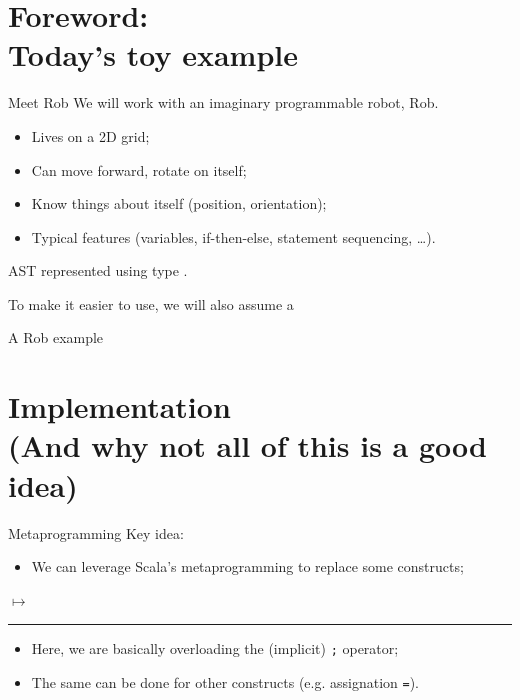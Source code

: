 \documentclass{beamer}
\newcommand{\translation}[2][0.5]{%
    \begin{minipage}[t]{#1\textwidth - 0.05\textwidth}%
    \end{minipage}%
    \hfill{}$\longmapsto$\hfill{}%
    \begin{minipage}[t]{0.95\textwidth - #1\textwidth}%
    \end{minipage}
    \rule{\textwidth}{0.4pt}
}
\begin{document}
    \section{Foreword:\\Today's toy example}

    \begin{frame}{Meet Rob}
        We will work with an imaginary programmable robot, Rob.
        \begin{itemize}
            \item Lives on a 2D grid;
            \item Can move forward, rotate on itself;
            \item Know things about itself (position, orientation);
            \item Typical features (variables, if-then-else, statement sequencing, \ldots{}).
        \end{itemize}

        AST represented using type .

        \pause
        To make it easier to use, we will also assume a
    \end{frame}

    \begin{frame}{A Rob example}
        

    \end{frame}

    \section{Implementation\\\footnotesize{(And why not all of this is a good idea)}}

    \begin{frame}{Metaprogramming}
        Key idea:
        \begin{itemize}
            \item We can leverage Scala's metaprogramming to replace some constructs;
        \end{itemize}
        \translation{code/rewriting}
        \begin{itemize}
            \item<2-> Here, we are basically overloading the (implicit) \lstinline{;} operator;
            \item<2-> The same can be done for other constructs (e.g. assignation \lstinline{=}).
        \end{itemize}
    \end{frame}
\end{document}
